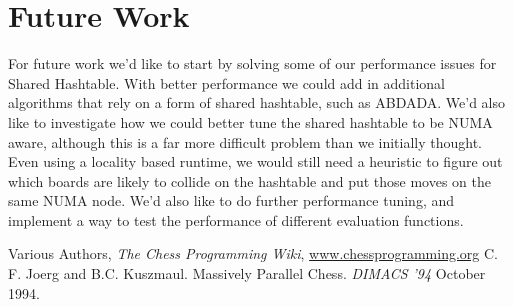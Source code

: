 \documentclass[]{article}
\begin{document}
\section{Future Work}
For future work we'd like to start by solving some of our performance issues for Shared Hashtable.  With better performance we could add in additional algorithms that rely on a form of shared hashtable, such as ABDADA.  We'd also like to investigate how we could better tune the shared hashtable to be NUMA aware, although this is a far more difficult problem than we initially thought.  Even using a locality based runtime, we would still need a heuristic to figure out which boards are likely to collide on the hashtable and put those moves on the same NUMA node.  We'd also like to do further performance tuning, and implement a way to test the performance of different evaluation functions.
\begin{thebibliography}{9}
  Various Authors,
  \textit{The Chess Programming Wiki},
  \url{www.chessprogramming.org}
  C. F. Joerg and B.C. Kuszmaul.
  Massively Parallel Chess.
  \textit{DIMACS '94}
  October 1994.
\end{thebibliography}
\end{document}
